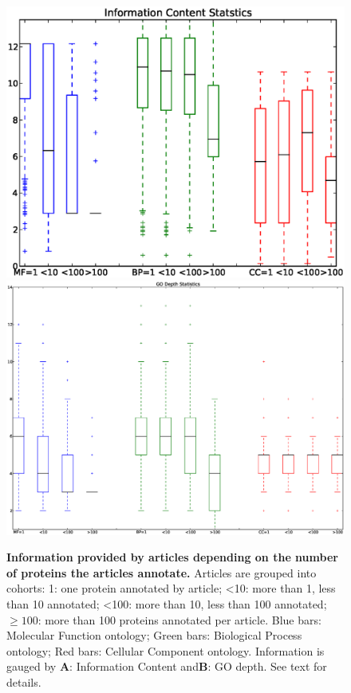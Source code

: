 \documentclass[12pt]{article}
\begin{document}
\begin{figure}[!ht]
\begin{center}
\includegraphics[width=6in]{boxplots-IC.eps}
\includegraphics[width=5in]{boxplots-GOdepth.eps}
\end{center}
\caption{
{\bf Information provided by articles depending on the number of proteins the articles annotate.}
Articles are grouped into cohorts: 1: one protein annotated by article; <10: more than 1, less than 10
annotated; <100: more than 10, less than 100 annotated; $\ge 100$: more than 100 proteins annotated per
article. Blue bars: Molecular Function ontology; Green bars: Biological Process ontology; Red bars:
Cellular Component ontology. Information is gauged by {\bf A}: Information Content and{\bf B}: GO depth.
See text for details.}
\label{fig:go-depth}
\end{figure}
\clearpage
\end{document}
